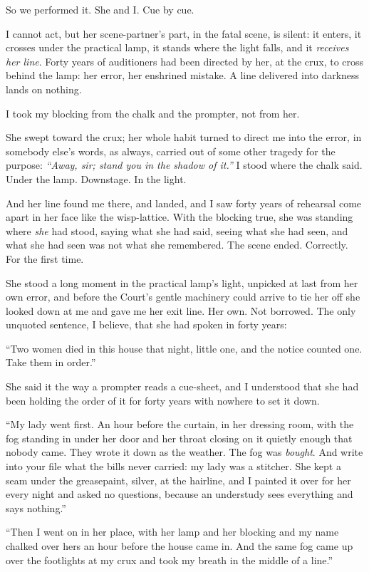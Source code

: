 So we performed it. She and I. Cue by cue.

I cannot act, but her scene-partner's part, in the fatal scene, is silent: it enters, it crosses under the practical lamp, it stands where the light falls, and it \emph{receives her line}. Forty years of auditioners had been directed by her, at the crux, to cross behind the lamp: her error, her enshrined mistake. A line delivered into darkness lands on nothing.

I took my blocking from the chalk and the prompter, not from her.

She swept toward the crux; her whole habit turned to direct me into the error, in somebody else's words, as always, carried out of some other tragedy for the purpose: \emph{``Away, sir; stand you in the shadow of it.''} I stood where the chalk said. Under the lamp. Downstage. In the light.

And her line found me there, and landed, and I saw forty years of rehearsal come apart in her face like the wisp-lattice. With the blocking true, she was standing where \emph{she} had stood, saying what she had said, seeing what she had seen, and what she had seen was not what she remembered. The scene ended. Correctly. For the first time.

She stood a long moment in the practical lamp's light, unpicked at last from her own error, and before the Court's gentle machinery could arrive to tie her off she looked down at me and gave me her exit line. Her own. Not borrowed. The only unquoted sentence, I believe, that she had spoken in forty years:

``Two women died in this house that night, little one, and the notice counted one. Take them in order.''

She said it the way a prompter reads a cue-sheet, and I understood that she had been holding the order of it for forty years with nowhere to set it down.

``My lady went first. An hour before the curtain, in her dressing room, with the fog standing in under her door and her throat closing on it quietly enough that nobody came. They wrote it down as the weather. The fog was \emph{bought}. And write into your file what the bills never carried: my lady was a stitcher. She kept a seam under the greasepaint, silver, at the hairline, and I painted it over for her every night and asked no questions, because an understudy sees everything and says nothing.''

``Then I went on in her place, with her lamp and her blocking and my name chalked over hers an hour before the house came in. And the same fog came up over the footlights at my crux and took my breath in the middle of a line.''

